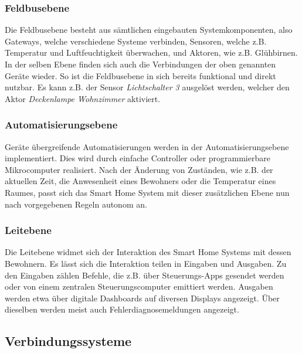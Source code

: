 \subsubsection{Feldbusebene}

Die Feldbusebene besteht aus sämtlichen eingebauten Systemkomponenten, also Gateways, welche verschiedene Systeme verbinden, Sensoren, welche z.B. Temperatur und Luftfeuchtigkeit überwachen, und Aktoren, wie z.B. Glühbirnen.
In der selben Ebene finden sich auch die Verbindungen der oben genannten Geräte wieder.
So ist die Feldbusebene in sich bereits funktional und direkt nutzbar.
Es kann z.B. der Sensor \textit{Lichtschalter 3} ausgelöst werden, welcher den Aktor \textit{Deckenlampe Wohnzimmer} aktiviert.

\subsubsection{Automatisierungsebene}

Geräte übergreifende Automatisierungen werden in der Automatisierungsebene implementiert.
Dies wird durch einfache Controller oder programmierbare Mikrocomputer realisiert.
Nach der Änderung von Zuständen, wie z.B. der aktuellen Zeit, die Anwesenheit eines Bewohners oder die Temperatur eines Raumes, passt sich das Smart Home System mit dieser zusätzlichen Ebene nun nach vorgegebenen Regeln autonom an.

\subsubsection{Leitebene}

Die Leitebene widmet sich der Interaktion des Smart Home Systems mit dessen Bewohnern.
Es lässt sich die Interaktion teilen in Eingaben und Ausgaben.
Zu den Eingaben zählen Befehle, die z.B. über Steuerungs-Apps gesendet werden oder von einem zentralen Steuerungscomputer emittiert werden.
Ausgaben werden etwa über digitale Dashboards auf diversen Displays angezeigt.
Über dieselben werden meist auch Fehlerdiagnosemeldungen angezeigt.


\subsection{Verbindungssysteme}

